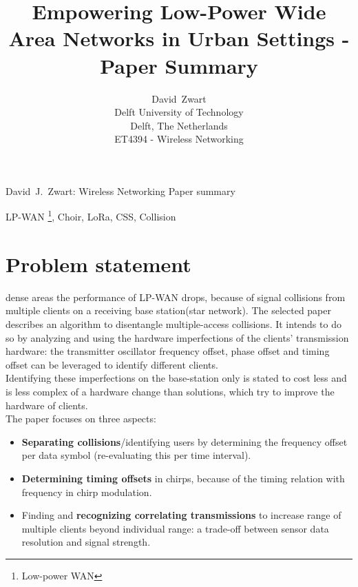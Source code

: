 \documentclass[a4paper,journal]{IEEEtran_custom}
\begin{document}
\title{\vspace*{0.405cm} Empowering
Low-Power Wide Area Networks in Urban Settings - Paper Summary}
\author{\vspace*{0.4cm}David~Zwart \\
Delft University of Technology \\
Delft, The Netherlands\\
ET4394 - Wireless Networking
}
%
{David~J.~Zwart: Wireless Networking Paper summary}

\maketitle

\begin{IEEEkeywords}
LP-WAN \footnote{Low-power WAN}, Choir, LoRa, CSS, Collision
\end{IEEEkeywords}

\section{Problem statement}

 dense areas the performance of LP-WAN drops, because of signal collisions from multiple clients on a receiving base station(star network). The selected paper\cite{paper1} describes an algorithm to disentangle multiple-access collisions. It intends to do so by analyzing and using the hardware imperfections of the clients' transmission hardware: the transmitter oscillator frequency offset, phase offset and timing offset can be leveraged to identify different clients. \\ 

Identifying these imperfections on the base-station only is stated to cost less and is less complex of a hardware change than solutions, which try to improve the hardware of clients. \\
The paper focuses on three aspects:
\begin{itemize}
    \item \textbf{Separating collisions}/identifying users by determining the frequency offset per data symbol (re-evaluating this per time interval).
    \item \textbf{Determining timing offsets} in chirps, because of the timing relation with frequency in chirp modulation.
    \item Finding and \textbf{recognizing correlating transmissions} to increase range of multiple clients beyond individual range: a trade-off between sensor data resolution and signal strength.
\end{itemize}
\end{document}

